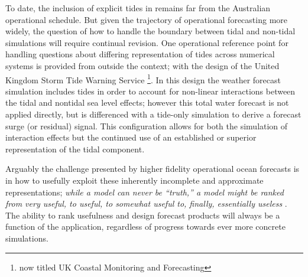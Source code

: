 To date, the inclusion of explicit tides in \BL{} remains far from the Australian operational schedule.
But given the trajectory of operational forecasting more widely, the question of how to handle the boundary between tidal and non-tidal simulations will require continual revision.
One operational reference point for handling questions about differing representation of tides across numerical systems is provided from outside the \OGCM{} context; with the design of the United Kingdom Storm Tide Warning Service \footnote{now titled UK Coastal Monitoring and Forecasting}\citep{Horsburgh:2008gw}.   In this design the weather forecast simulation includes tides in order to account for non-linear interactions between the tidal and nontidal sea level effects; however this total water forecast is not applied directly, but is differenced with a tide-only simulation to derive a forecast surge (or residual) signal.   This configuration allows for both the simulation of interaction effects but the continued use of an established or superior representation of the tidal component.


Arguably the challenge presented by higher fidelity operational ocean forecasts is in how to usefully exploit these inherently incomplete and approximate representations;  
\textit{while a model can never be “truth,” a model might be ranked from very useful, to useful, to somewhat useful to, ﬁnally, essentially useless} \citep{Burnham:2002}.
The ability to rank usefulness and design forecast products will always be a function of the application, regardless of progress towards ever more concrete simulations.

